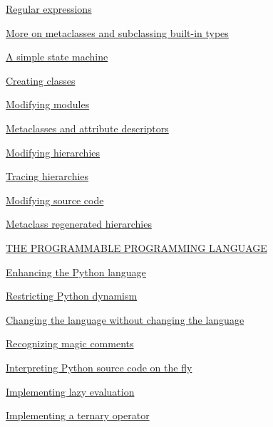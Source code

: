 \documentclass[10pt,english]{article}
\begin{document}
\begin{list}{}{}
\begin{list}{}{}
\item {} \href{\#regular-expressions}{Regular expressions}

\item {} \href{\#more-on-metaclasses-and-subclassing-built-in-types}{More on metaclasses and subclassing built-in types}

\item {} \href{\#a-simple-state-machine}{A simple state machine}

\item {} \href{\#creating-classes}{Creating classes}

\item {} \href{\#modifying-modules}{Modifying modules}

\item {} \href{\#metaclasses-and-attribute-descriptors}{Metaclasses and attribute descriptors}

\item {} \href{\#id46}{Modifying hierarchies}

\item {} \href{\#tracing-hierarchies}{Tracing hierarchies}

\item {} \href{\#modifying-source-code}{Modifying source code}

\item {} \href{\#metaclass-regenerated-hierarchies}{Metaclass regenerated hierarchies}

\end{list}

\item {} \href{\#the-programmable-programming-language}{THE PROGRAMMABLE PROGRAMMING LANGUAGE}
\begin{list}{}{}
\item {} \href{\#enhancing-the-python-language}{Enhancing the Python language}

\item {} \href{\#restricting-python-dynamism}{Restricting Python dynamism}

\item {} \href{\#changing-the-language-without-changing-the-language}{Changing the language without changing the language}

\item {} \href{\#recognizing-magic-comments}{Recognizing magic comments}

\item {} \href{\#interpreting-python-source-code-on-the-fly}{Interpreting Python source code on the fly}

\item {} \href{\#implementing-lazy-evaluation}{Implementing lazy evaluation}

\item {} \href{\#implementing-a-ternary-operator}{Implementing a ternary operator}

\end{list}

\end{list}
\end{document}
